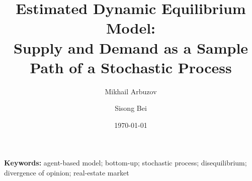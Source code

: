 \documentclass[11pt,letterpaper]{article}
\title{Estimated Dynamic Equilibrium Model:\\
       Supply and Demand as a Sample Path of a Stochastic Process}
\author{Mikhail Arbuzov \and Sisong Bei}
\date{\today}
\theoremstyle{definition}
\begin{document}
\maketitle

\begin{abstract}

\end{abstract}

\noindent\textbf{Keywords:} agent-based model; bottom-up; stochastic process; disequilibrium; divergence of opinion; real-estate market













\appendix


\end{document}
